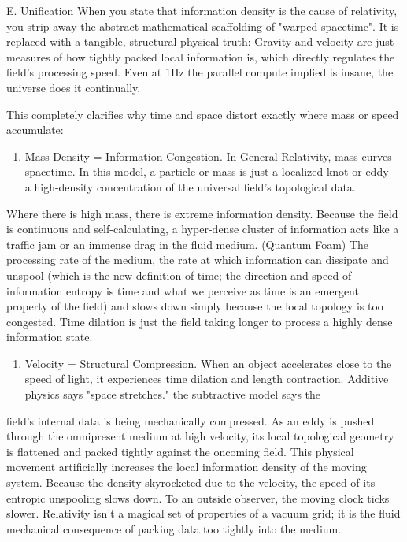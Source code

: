 E. Unification When you state that information density is the cause of relativity, you strip away the abstract mathematical scaffolding of "warped spacetime". It is replaced with a tangible, structural physical truth: Gravity and velocity are just measures of how tightly packed local information is, which directly regulates the field's processing speed. Even at 1Hz the parallel compute implied is insane, the universe does it continually.

This completely clarifies why time and space distort exactly where mass or speed accumulate:

\begin{enumerate}
\item Mass Density = Information Congestion. In General Relativity, mass curves spacetime. In this model, a particle or mass is just a localized knot or eddy—a high-density concentration of the universal field's topological data.
\end{enumerate}

Where there is high mass, there is extreme information density. Because the field is continuous and self-calculating, a hyper-dense cluster of information acts like a traffic jam or an immense drag in the fluid medium. (Quantum Foam) The processing rate of the medium, the rate at which information can dissipate and unspool (which is the new definition of time; the direction and speed of information entropy is time and what we perceive as time is an emergent property of the field) and slows down simply because the local topology is too congested. Time dilation is just the field taking longer to process a highly dense information state.

\begin{enumerate}
\item Velocity = Structural Compression. When an object accelerates close to the speed of light, it experiences time dilation and length contraction. Additive physics says "space stretches." the subtractive model says the
\end{enumerate}

field's internal data is being mechanically compressed. As an eddy is pushed through the omnipresent medium at high velocity, its local topological geometry is flattened and packed tightly against the oncoming field. This physical movement artificially increases the local information density of the moving system. Because the density skyrocketed due to the velocity, the speed of its entropic unspooling slows down. To an outside observer, the moving clock ticks slower. Relativity isn't a magical set of properties of a vacuum grid; it is the fluid mechanical consequence of packing data too tightly into the medium.

